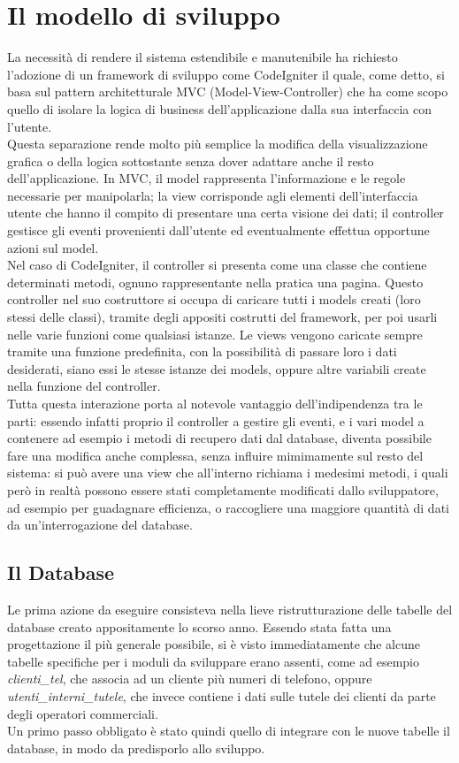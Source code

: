 \section{Il modello di sviluppo}
La necessit\`a di rendere il sistema estendibile e manutenibile ha richiesto l'adozione di un framework di sviluppo come CodeIgniter il quale, come detto, si basa sul pattern architetturale MVC (Model-View-Controller) che ha come scopo quello di isolare la logica di business dell'applicazione dalla sua interfaccia con l'utente.\\
Questa separazione rende molto pi\`u semplice la modifica della visualizzazione grafica o della logica sottostante senza dover adattare anche il resto dell'applicazione. In MVC, il model rappresenta l'informazione e le regole necessarie per manipolarla; la view corrisponde agli elementi dell'interfaccia utente che hanno il compito di presentare una certa visione dei dati; il controller gestisce gli eventi provenienti dall'utente ed eventualmente effettua opportune azioni sul model. \\
Nel caso di CodeIgniter, il controller si presenta come una classe che contiene determinati metodi, ognuno rappresentante nella pratica una pagina. Questo controller nel suo costruttore si occupa di caricare tutti i models creati (loro stessi delle classi), tramite degli appositi costrutti del framework, per poi usarli nelle varie funzioni come qualsiasi istanze. Le views vengono caricate sempre tramite una funzione predefinita, con la possibilit\`a di passare loro i dati desiderati, siano essi le stesse istanze dei models, oppure altre variabili create nella funzione del controller.  \\
Tutta questa interazione porta al notevole vantaggio dell'indipendenza tra le parti: essendo infatti proprio il controller a gestire gli eventi, e i vari model a contenere ad esempio i metodi di recupero dati dal database, diventa possibile fare una modifica anche complessa, senza influire mimimamente sul resto del sistema: si pu\`o avere una view che all'interno richiama i medesimi metodi, i quali per\`o in realt\`a possono essere stati completamente modificati dallo sviluppatore, ad esempio per guadagnare efficienza, o raccogliere una maggiore quantit\`a di dati da un'interrogazione del database.

\newpage
\subsection{Il Database}
Le prima azione da eseguire consisteva nella lieve ristrutturazione delle tabelle del database creato appositamente lo scorso anno. Essendo stata fatta una progettazione il pi\`u generale possibile, si \`e visto immediatamente che alcune tabelle specifiche per i moduli da sviluppare erano assenti, come ad esempio \textit{clienti\_tel}, che associa ad un cliente pi\`u numeri di telefono, oppure \textit{utenti\_interni\_tutele}, che invece contiene i dati sulle tutele dei clienti da parte degli operatori commerciali. \\
Un primo passo obbligato \`e stato quindi quello di integrare con le nuove tabelle il database, in modo da predisporlo allo sviluppo.

